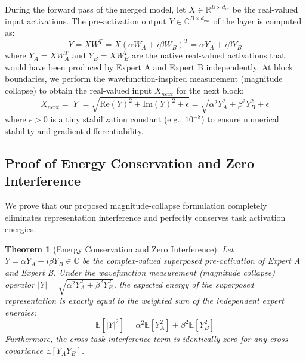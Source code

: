 \documentclass{article}
\theoremstyle{plain}
\newtheorem{theorem}{Theorem}[section]
\theoremstyle{definition}
\theoremstyle{remark}
\begin{document}
During the forward pass of the merged model, let $X \in \mathbb{R}^{B \times d_{in}}$ be the real-valued input activations. The pre-activation output $Y \in \mathbb{C}^{B \times d_{out}}$ of the layer is computed as:
\begin{equation}
Y = X W^T = X (\alpha W_A + i \beta W_B)^T = \alpha Y_A + i \beta Y_B
\end{equation}
where $Y_A = X W_A^T$ and $Y_B = X W_B^T$ are the native real-valued activations that would have been produced by Expert A and Expert B independently. At block boundaries, we perform the wavefunction-inspired measurement (magnitude collapse) to obtain the real-valued input $X_{next}$ for the next block:
\begin{equation}
X_{next} = |Y| = \sqrt{\text{Re}(Y)^2 + \text{Im}(Y)^2 + \epsilon} = \sqrt{\alpha^2 Y_A^2 + \beta^2 Y_B^2 + \epsilon}
\end{equation}
where $\epsilon > 0$ is a tiny stabilization constant (e.g., $10^{-8}$) to ensure numerical stability and gradient differentiability.

\subsection{Proof of Energy Conservation and Zero Interference}
We prove that our proposed magnitude-collapse formulation completely eliminates representation interference and perfectly conserves task activation energies.

\begin{theorem}[Energy Conservation and Zero Interference]
Let $Y = \alpha Y_A + i \beta Y_B \in \mathbb{C}$ be the complex-valued superposed pre-activation of Expert A and Expert B. Under the wavefunction measurement (magnitude collapse) operator $|Y| = \sqrt{\alpha^2 Y_A^2 + \beta^2 Y_B^2}$, the expected energy of the superposed representation is exactly equal to the weighted sum of the independent expert energies:
\begin{equation}
\mathbb{E}[|Y|^2] = \alpha^2 \mathbb{E}[Y_A^2] + \beta^2 \mathbb{E}[Y_B^2]
\end{equation}
Furthermore, the cross-task interference term is identically zero for any cross-covariance $\mathbb{E}[Y_A Y_B]$.
\end{theorem}
\end{document}
